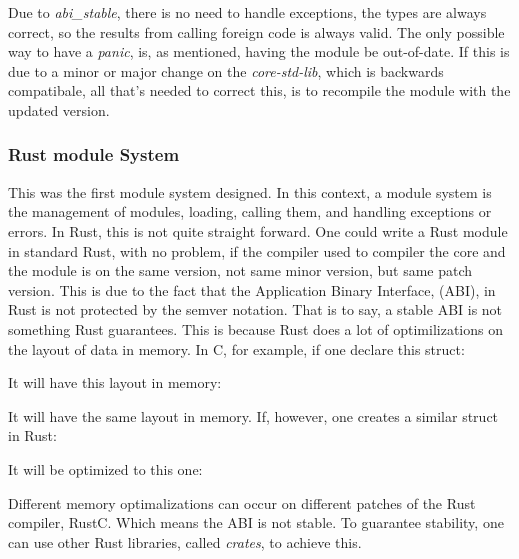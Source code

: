 \documentclass[runningheads]{llncs}
\begin{document}

Due to \textit{abi_stable}, there is no need to handle exceptions, the types are
always correct, so the results from calling foreign code is always valid. The
only possible way to have a \textit{panic}, is, as mentioned, having the module
be out-of-date. If this is due to a minor or major change on the
\textit{core-std-lib}, which is backwards compatibale, all that's needed to
correct this, is to recompile the module with the updated version.

\subsubsection{Rust module System}
This was the first module system designed. In this context, a module system is
the management of modules, loading, calling them, and handling exceptions or
errors. In Rust, this is not quite straight forward. One could write a Rust
module in standard Rust, with no problem, if the compiler used to compiler the
core and the module is on the same version, not same minor version, but same
patch version. %
This is due to the fact that the Application Binary Interface, (ABI), in Rust
is not protected by the semver notation. That is to say, a stable ABI is not
something Rust guarantees.
This is because Rust does a lot of optimilizations on the layout of data in
memory. In C, for example, if one declare this struct:

It will have this layout in memory:


It will have the same layout in memory. If, however, one creates a similar
struct in Rust:

It will be optimized to this one:


Different memory optimalizations can occur on different patches of the Rust
compiler, RustC. Which means the ABI is not stable. To guarantee stability, one
can use other Rust libraries, called \textit{crates}, to achieve this.
\end{document}
